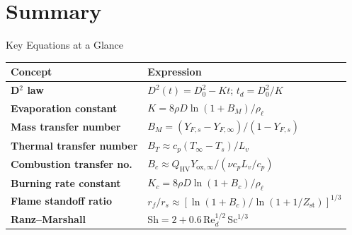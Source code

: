 \documentclass[12pt,aspectratio=169]{beamer}
\begin{document}
\section{Summary}

\begin{frame}{Key Equations at a Glance}
  \renewcommand{\arraystretch}{1.6}
  \begin{tabular}{>{\bfseries}p{3.8cm} p{8.0cm}}
    \toprule
    Concept & Expression \\
    \midrule
    D$^2$ law & $D^2(t) = D_0^2 - Kt$; \quad $t_d = D_0^2/K$ \\
    Evaporation constant & $K = 8\rho D\ln(1+B_M)/\rho_\ell$ \\
    Mass transfer number & $B_M = (Y_{F,s} - Y_{F,\infty})/(1-Y_{F,s})$ \\
    Thermal transfer number & $B_T \approx c_p(T_\infty-T_s)/L_v$ \\
    Combustion transfer no. & $B_c \approx Q_{\text{HV}} Y_{\text{ox},\infty}/(\nu c_p L_v/c_p)$ \\
    Burning rate constant & $K_c = 8\rho D\ln(1+B_c)/\rho_\ell$ \\
    Flame standoff ratio & $r_f/r_s \approx [\ln(1+B_c)/\ln(1+1/Z_{\text{st}})]^{1/3}$ \\
    Ranz--Marshall & $\mathrm{Sh} = 2 + 0.6\,\mathrm{Re}_d^{1/2}\,\mathrm{Sc}^{1/3}$ \\
    \bottomrule
  \end{tabular}
\end{frame}
\end{document}
